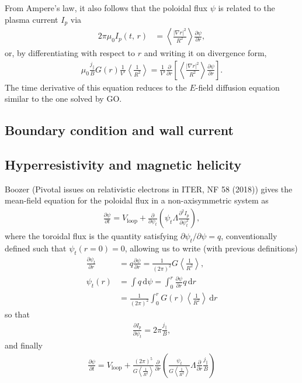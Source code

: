 \documentclass[11pt,a4paper]{article}
\newcommand{\rd}{\ensuremath{\mathrm{d}}}
\newcommand{\sub}[1]{\ensuremath{_{\text{#1}}}}
\begin{document}
From Ampere's law, it also follows that the poloidal flux $\psi$ is related to the plasma current $I_p$ via
\begin{align}
2\pi \mu_0 I_p(t,\,r) &= \left\langle \frac{|\nabla r|^2}{R^2}\right\rangle \frac{\partial \psi}{\partial r},
\end{align}
or, by differentiating with respect to $r$ and writing it on divergence form,
\begin{align}
\mu_0 \frac{j_\parallel}{B} G(r)\frac{1}{V'}\left\langle \frac{1}{R^2}\right\rangle = \frac{1}{V'}\frac{\partial }{\partial r}\left[\left\langle \frac{|\nabla r|^2}{R^2}\right\rangle \frac{\partial \psi}{\partial r}\right].
\end{align}
The time derivative of this equation reduces to the $E$-field diffusion equation similar to the one solved by GO.


\subsection{Boundary condition and wall current}

\subsection{Hyperresistivity and magnetic helicity}
Boozer (Pivotal issues on relativistic electrons in ITER, NF 58 (2018)) gives the mean-field equation for the poloidal flux in a non-axisymmetric system as
\begin{align}
\frac{\partial \psi}{\partial t} = V\sub{loop} + \frac{\partial}{\partial \psi_t}\left(\psi_t \Lambda \frac{\partial^2 I_p}{\partial \psi_t^2}\right),
\end{align}
where the toroidal flux is the quantity satisfying $\partial \psi_t/\partial \psi = q$, conventionally defined such that $\psi_t(r=0) = 0$, allowing us to write (with previous definitions) 
\begin{align}
\frac{\partial \psi_t}{\partial r} &= q\frac{\partial \psi}{\partial r} = \frac{1}{(2\pi)^2}G\left\langle\frac{1}{R^2}\right\rangle, \nonumber \\
\psi_t(r) &= \int q \,\rd \psi = \int_0^r \frac{\partial \psi}{\partial r}q\,\rd r \nonumber \\
&= \frac{1}{(2\pi)^2} \int_0^r G(r) \left\langle\frac{1}{R^2}\right\rangle \,\rd r
\end{align}
so that
\begin{align}
\frac{\partial I_p}{\partial \psi_t} = 2\pi \frac{j_\parallel}{B},
\end{align}
and finally 
\begin{align}
\frac{\partial \psi}{\partial t} = V\sub{loop} + \frac{(2\pi)^5}{G\left\langle\frac{1}{R^2}\right\rangle}\frac{\partial}{\partial r}\left(\frac{\psi_t}{G\left\langle\frac{1}{R^2}\right\rangle}\Lambda \frac{\partial}{\partial r}\frac{j_\parallel}{B}\right)
\end{align}
\end{document}
